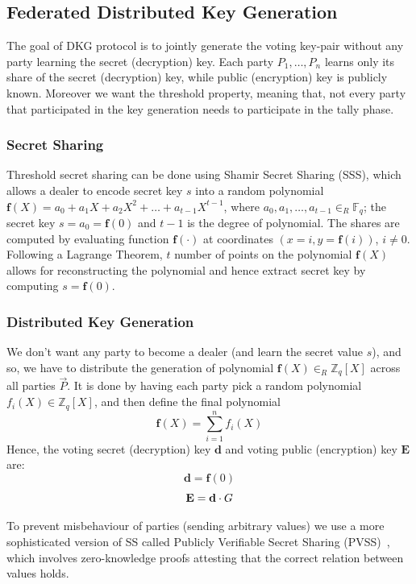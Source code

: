 \documentclass[runningheads]{llncs}
\begin{document}
\subsection{Federated Distributed Key Generation}
The goal of DKG protocol is to jointly generate the voting key-pair without any party learning the secret (decryption) key. Each party $P_1,\dots,P_n$ learns only its share of the secret (decryption) key, while public (encryption) key is publicly known. Moreover we want the threshold property, meaning that, not every party that participated in the key generation needs to participate in the tally phase.

\subsubsection*{Secret Sharing}

Threshold secret sharing can be done using Shamir Secret Sharing (SSS), which allows a dealer to encode secret key $s$ into a random polynomial $\mathbf{f}(X) = a_0 + a_1X + a_2X^2 + \dots + a_{t-1}X^{t-1}$, where $a_0,a_1,\dots,a_{t-1} \in_R \mathbb{F}_q$; the secret key $s=a_0=\mathbf{f}(0)$ and $t-1$ is the degree of polynomial. The shares are computed by evaluating function $\mathbf{f}(\cdot)$ at coordinates $(x=i,y=\mathbf{f}(i))$, $i \neq 0$. Following a Lagrange Theorem, $t$ number of points on the polynomial $\mathbf{f}(X)$ allows for reconstructing the polynomial and hence extract secret key by computing $s = \mathbf{f}(0)$.

\subsubsection*{Distributed Key Generation}
We don't want any party to become a dealer (and learn the secret value $s$), and so, we have to distribute the generation of polynomial $\mathbf{f}(X) \in_R \mathbb{Z}_q[X]$ across all parties $\vec{P}$. It is done by having each party pick a random polynomial $f_{i}(X) \in \mathbb{Z}_q[X]$, and then define the final polynomial \[\mathbf{f}(X)=\sum_{i=1}^{n}f_i(X)\] Hence, the voting secret (decryption) key $\mathbf{d}$ and voting public (encryption) key $\mathbf{E}$ are: $$\mathbf{d}=\mathbf{f}(0)$$ $$\mathbf{E}=\mathbf{d} \cdot G$$ 

To prevent misbehaviour of parties (sending arbitrary values) we use a more sophisticated version of SS called Publicly Verifiable Secret Sharing (PVSS)~\cite{goosSimplePubliclyVerifiable1999}, which involves zero-knowledge proofs attesting that the correct relation between values holds.
\end{document}
